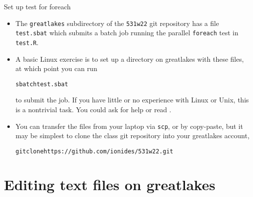 \begin{frame}[fragile]{Set up test for foreach} 

\begin{itemize}
\item
The \texttt{greatlakes} subdirectory of the \texttt{531w22} git repository has a file \texttt{test.sbat} which submits a batch job running the parallel \texttt{foreach} test in \texttt{test.R}.
\item
A basic Linux exercise is to set up a directory on greatlakes with these files, at which point you can run
\begin{knitrout}\small
{}\color{fgcolor}\begin{kframe}
\begin{alltt}
sbatch test.sbat
\end{alltt}
\end{kframe}
\end{knitrout}
to submit the job. If you have little or no experience with Linux or Unix, this is a nontrivial task. You could ask for help or read .
\item You can transfer the files from your laptop via \texttt{scp}, or by copy-paste, but it may be simplest to clone the class git repository into your greatlakes account,
\begin{knitrout}\small
{}\color{fgcolor}\begin{kframe}
\begin{alltt}
git clone https://github.com/ionides/531w22.git
\end{alltt}
\end{kframe}
\end{knitrout}
\end{itemize}

\end{frame}

\section{Editing text files on greatlakes}

